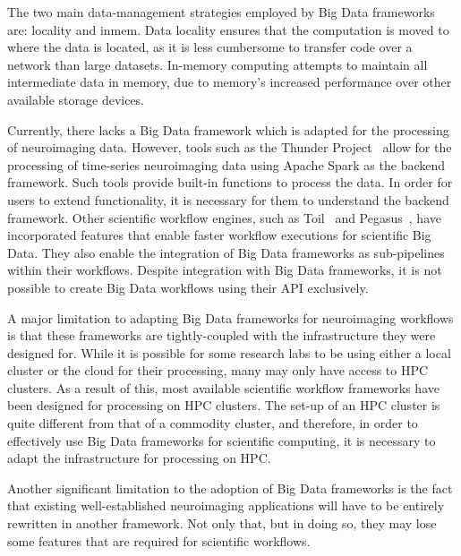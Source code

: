         The two main data-management strategies employed by Big Data frameworks
        are: \gls{locality} and \gls{inmem}. Data locality ensures that
        the computation is moved to where the data is located, as it is less cumbersome to
        transfer code over a network than large datasets. In-memory computing attempts
        to maintain all intermediate data in memory, due to memory's increased performance over
        other available storage devices.

        Currently, there lacks a Big Data framework which is adapted for the
        processing of neuroimaging data. However, tools such as the Thunder 
        Project~\cite{Freeman:2014aa} allow for the processing of time-series
        neuroimaging data using Apache Spark as the backend framework. Such tools
        provide built-in functions to process the data. In order for users to 
        extend functionality, it is necessary for them to understand the 
        backend framework. Other scientific workflow engines, such as 
        Toil~\cite{Vivian:2017aa} and Pegasus~\cite{DEELMAN201517}, have 
        incorporated features that enable
        faster workflow executions for scientific Big Data. They also enable
        the integration of Big Data frameworks as sub-pipelines within their 
        workflows. Despite integration with Big Data frameworks, it is not
        possible to create Big Data workflows using their API exclusively.

        A major limitation to adapting Big Data frameworks for neuroimaging 
        workflows is that these frameworks are tightly-coupled with the 
        infrastructure they were designed for. While
        it is possible for some research labs to be using either a local cluster
        or the cloud for their processing, many may only have access to HPC
        clusters. As a result of this, most available scientific workflow 
        frameworks have been designed for processing on HPC clusters. The 
        set-up of an HPC cluster is quite different from that of a commodity 
        cluster, and therefore, in order to effectively use Big Data frameworks
        for scientific computing, it is necessary to adapt the infrastructure 
        for processing on HPC.

        Another significant limitation to the adoption of Big Data frameworks is
        the fact that existing well-established neuroimaging applications will have
        to be entirely rewritten in another framework. Not only that, but in doing so,
        they may lose some features that are required for scientific workflows.


